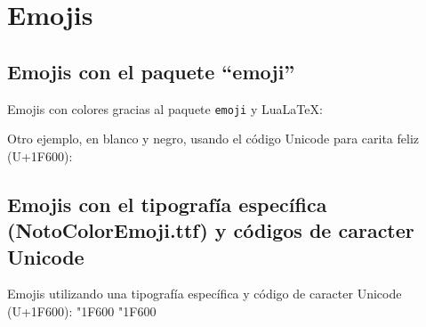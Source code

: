 \section{Emojis}


\subsection{Emojis con el paquete ``emoji''}

Emojis con colores gracias al paquete \texttt{emoji} y LuaLaTeX:

Otro ejemplo, en blanco y negro, usando el código Unicode para carita feliz (U+1F600): {}


\subsection{Emojis con el tipografía específica (NotoColorEmoji.ttf) y códigos de caracter Unicode}

\newfontfamily{}

Emojis utilizando una tipografía específica y código de caracter Unicode (U+1F600):
{\emojifont \Uchar"1F600 \char"1F600}
